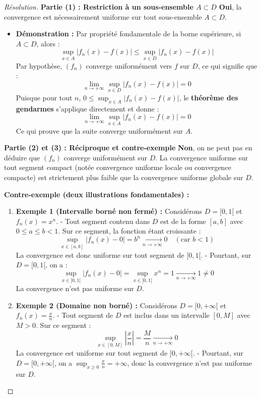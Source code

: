 \documentclass[12pt,a4paper]{report}
\begin{document}
\begin{proof}[Résolution]
\textbf{Partie (1) : Restriction à un sous-ensemble $A \subset D$}
\textbf{Oui}, la convergence est nécessairement uniforme sur tout sous-ensemble $A \subset D$.
\begin{itemize}
    \item \textbf{Démonstration :} Par propriété fondamentale de la borne supérieure, si $A \subset D$, alors :
    \[ \sup_{x \in A} |f_n(x) - f(x)| \le \sup_{x \in D} |f_n(x) - f(x)| \]
    Par hypothèse, $(f_n)$ converge uniformément vers $f$ sur $D$, ce qui signifie que :
    \[ \lim_{n \to +\infty} \sup_{x \in D} |f_n(x) - f(x)| = 0 \]
    Puisque pour tout $n$, $0 \le \sup_{x \in A} |f_n(x) - f(x)|$, le \textbf{théorème des gendarmes} s'applique directement et donne :
    \[ \lim_{n \to +\infty} \sup_{x \in A} |f_n(x) - f(x)| = 0 \]
    Ce qui prouve que la suite converge uniformément sur $A$.
\end{itemize}

\textbf{Partie (2) et (3) : Réciproque et contre-exemple}
\textbf{Non}, on ne peut pas en déduire que $(f_n)$ converge uniformément sur $D$.
La convergence uniforme sur tout segment compact (notée convergence uniforme locale ou convergence compacte) est strictement plus faible que la convergence uniforme globale sur $D$.

\textbf{Contre-exemple (deux illustrations fondamentales) :}
\begin{enumerate}
    \item \textbf{Exemple 1 (Intervalle borné non fermé) :} 
    Considérons $D = [0, 1[$ et $f_n(x) = x^n$.
    - Tout segment contenu dans $D$ est de la forme $[a, b]$ avec $0 \le a \le b < 1$. Sur ce segment, la fonction étant croissante :
    \[ \sup_{x \in [a, b]} |f_n(x) - 0| = b^n \xrightarrow[n \to +\infty]{} 0 \quad (\text{car } b < 1) \]
    La convergence est donc uniforme sur tout segment de $[0, 1[$.
    - Pourtant, sur $D = [0, 1[$, on a :
    \[ \sup_{x \in [0, 1[} |f_n(x) - 0| = \sup_{x \in [0, 1[} x^n = 1 \xrightarrow[n \to +\infty]{} 1 \neq 0 \]
    La convergence n'est pas uniforme sur $D$.
    \item \textbf{Exemple 2 (Domaine non borné) :} 
    Considérons $D = [0, +\infty[$ et $f_n(x) = \frac{x}{n}$.
    - Tout segment de $D$ est inclus dans un intervalle $[0, M]$ avec $M > 0$. Sur ce segment :
    \[ \sup_{x \in [0, M]} \left| \frac{x}{n} \right| = \frac{M}{n} \xrightarrow[n \to +\infty]{} 0 \]
    La convergence est uniforme sur tout segment de $[0, +\infty[$.
    - Pourtant, sur $D = [0, +\infty[$, on a $\sup_{x \ge 0} \frac{x}{n} = +\infty$, donc la convergence n'est pas uniforme sur $D$.
\end{enumerate}
\end{proof}
\end{document}
